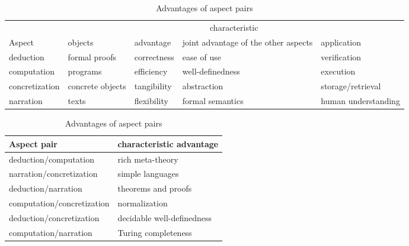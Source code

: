 \begin{table}[h]
\caption{Shared properties and advantages of aspects}\label{fig:tetrapod2}
\begin{subtable}{\textwidth}
\centering
\caption{Characteristics of aspects}
\begin{tabular}{lllp{2.8cm}l}
\toprule
	& \multicolumn{4}{c}{characteristic} \\
\cmidrule(lr){2-5}
Aspect &  objects & advantage & joint advantage of the other aspects & application \\
\midrule
deduction & formal proofs & correctness & ease of use & verification \\
computation & programs & efficiency & well-definedness & execution\\
concretization & concrete objects & tangibility & abstraction & storage/retrieval\\
narration & texts & flexibility & formal semantics & human understanding\\
\bottomrule
\end{tabular}
\end{subtable}

\medskip
\begin{subtable}{\textwidth}
\centering
\caption{Advantages of aspect pairs}
\begin{tabular}{ll}
\toprule
Aspect pair & characteristic advantage \\
\midrule
deduction/computation  & rich meta-theory \\
narration/concretization & simple languages \\
\addlinespace
deduction/narration  & theorems and proofs \\
computation/concretization & normalization \\
\addlinespace
deduction/concretization  & decidable well-definedness \\
computation/narration & Turing completeness \\
\bottomrule
\end{tabular}
\end{subtable}
\end{table}

